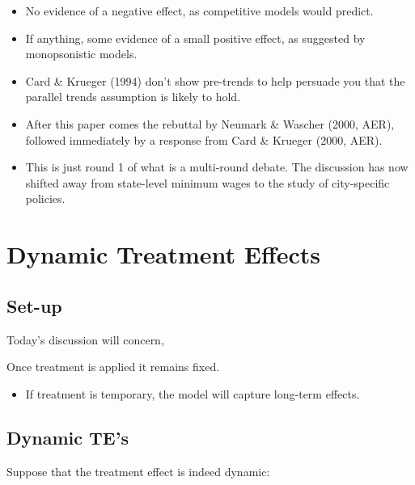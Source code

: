 \documentclass[
  letterpaper,
  DIV=11,
  numbers=noendperiod]{scrreprt}
\providecommand{\tightlist}{%
  \setlength{\itemsep}{0pt}\setlength{\parskip}{0pt}}\usepackage{longtable,booktabs,array}
\theoremstyle{definition}
\theoremstyle{remark}
\begin{document}
\begin{enumerate}
  \begin{itemize}
  \tightlist
  \item
    No evidence of a negative effect, as competitive models would
    predict.
  \item
    If anything, some evidence of a small positive effect, as suggested
    by monopsonistic models.
  \item
    Card \& Krueger (1994) don't show pre-trends to help persuade you
    that the parallel trends assumption is likely to hold.
  \item
    After this paper comes the rebuttal by Neumark \& Wascher (2000,
    AER), followed immediately by a response from Card \& Krueger (2000,
    AER).
  \item
    This is just round 1 of what is a multi-round debate. The discussion
    has now shifted away from state-level minimum wages to the study of
    city-specific policies.
  \end{itemize}

  \chapter{Dynamic Treatment Effects}\label{dynamic-treatment-effects}

  \section{Set-up}\label{set-up}

  Today's discussion will concern,

  Once treatment is applied it remains fixed.

  \begin{itemize}
  \tightlist
  \item
    If treatment is temporary, the model will capture long-term effects.
  \end{itemize}

  \section{Dynamic TE's}\label{dynamic-tes}

  Suppose that the treatment effect is indeed dynamic:

  \begin{tcolorbox}[enhanced jigsaw, bottomrule=.15mm, coltitle=black, arc=.35mm, left=2mm, opacityback=0, leftrule=.75mm, colbacktitle=quarto-callout-note-color!10!white, title={Note}, toprule=.15mm, bottomtitle=1mm, breakable, colframe=quarto-callout-note-color-frame, opacitybacktitle=0.6, titlerule=0mm, colback=white, rightrule=.15mm, toptitle=1mm]


\end{tcolorbox}
\end{enumerate}
\end{document}
